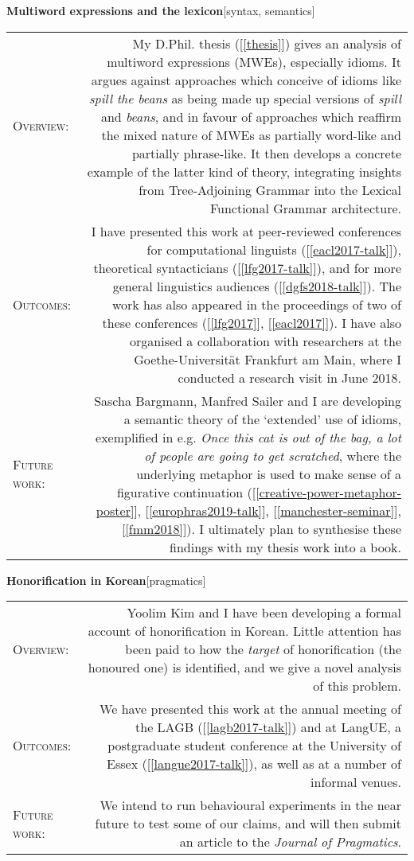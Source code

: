 \documentclass[11pt,a4paper]{article}
\makeatletter
\newlength{\rulelength}%
\newcommand{\REx}[2]{%
\vspace*{0.1\baselineskip}%
{\large\textbf{#1}\hfill\textnormal{[#2]}}%
\vspace*{0.5\baselineskip}%
}
\newenvironment{cvsection}{%
  \setlength{\extrarowheight}{0.70ex}
  \begin{longtable}[l]{@{} L R @{}}
}{%
  \end{longtable}
}
\newcommand{\sref}[1]{[\ref{#1}]}
\newcommand{\subhead}[1]{%
\textsc{#1}:%
}
\makeatother
\begin{document}
\REx{Multiword expressions and the lexicon}{syntax, semantics}
\begin{cvsection}
  \subhead{Overview} &%
  My D.Phil. thesis (\sref{thesis}) gives an analysis of multiword expressions (MWEs), especially idioms. It argues against approaches which conceive of idioms like \emph{spill the beans} as being made up special versions of \emph{spill} and \emph{beans}, and in favour of approaches which reaffirm the mixed nature of MWEs as partially word-like and partially phrase-like. It then develops a concrete example of the latter kind of theory, integrating insights from Tree-Adjoining Grammar into the Lexical Functional Grammar architecture.%
\\
  \subhead{Outcomes} &%
  I have presented this work at peer-reviewed conferences for computational linguists (\sref{eacl2017-talk}), theoretical syntacticians (\sref{lfg2017-talk}), and for more general linguistics audiences (\sref{dgfs2018-talk}). The work has also appeared in the proceedings of two of these conferences (\sref{lfg2017}, \sref{eacl2017}).
  I have also organised a collaboration with researchers at the Goethe-Universit\"{a}t Frankfurt am Main, where I conducted a research visit in June 2018.
\\
  \subhead{Future work} &%
  Sascha Bargmann, Manfred Sailer and I are developing a semantic theory of the `extended' use of idioms, exemplified in e.g. \textit{Once this cat is out of the bag, a lot of people are going to get scratched}, where the underlying metaphor is used to make sense of a figurative continuation (\sref{creative-power-metaphor-poster}, \sref{europhras2019-talk}, \sref{manchester-seminar}, \sref{fmm2018}). I ultimately plan to synthesise these findings with my thesis work into a book.
\end{cvsection}

\REx{Honorification in Korean}{pragmatics}
\begin{cvsection}
  \subhead{Overview} &%
  Yoolim Kim and I have been developing a formal account of honorification in Korean. Little attention has been paid to how the \emph{target} of honorification (the honoured one) is identified, and we give a novel analysis of this problem.%
\\
  \subhead{Outcomes} &%
  We have presented this work at the annual meeting of the LAGB (\sref{lagb2017-talk}) and at LangUE, a postgraduate student conference at the University of Essex (\sref{langue2017-talk}), as well as at a number of informal venues.%
\\
  \subhead{Future work} &%
  We intend to run behavioural experiments in the near future to test some of our claims, and will then submit an article to the \textit{Journal of Pragmatics}.
\end{cvsection}
\end{document}
